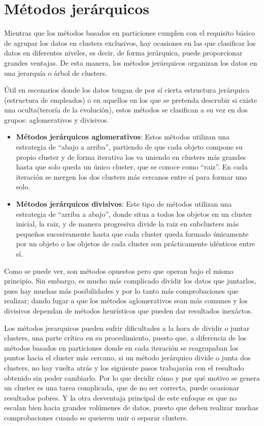 \documentclass[3p,twocolumn]{elsarticle}
\begin{document}
\section{Métodos jerárquicos} \label{sec:Métodos jerárquicos}

Mientras que los métodos basados en particiones cumplen con el requisito básico de agrupar los datos en clusters exclusivos, hay ocasiones en las que clasificar los datos en diferentes niveles, es decir, de forma jerárquica, puede proporcionar grandes ventajas. De esta manera, los métodos jerárquicos organizan los datos en una jerarquía o árbol de clusters. 

Útil en escenarios donde los datos tengan de por sí cierta estructura jerárquica (estructura de empleados) o en aquellos en los que se pretenda descrubir si existe una oculta(teroría de la evolución), estos métodos se clasifican a su vez en dos grupos: aglomerativos y divisivos. 

\begin{itemize}
  \item \textbf{Métodos jerárquicos aglomerativos}: Estos métodos utilizan una estrategia de ``abajo a arriba'', partiendo de que cada objeto compone su propio cluster y de forma iterativa los va uniendo en clusters más grandes hasta que solo queda un único cluster, que se conoce como ``raiz''. En cada iteración se mergen los dos clusters más cercanos entre sí para formar uno solo.

  \item \textbf{Métodos jerárquicos divisivos}: Este tipo de métodos utilizan una estrategia de ``arriba a abajo'', donde situa a todos los objetos en un cluster inicial, la raiz, y de manera progresiva divide la raiz en subclusters más pequeños sucesivamente hasta que cada cluster queda formado únicamente por un objeto o los objetos de cada cluster son prácticamente idénticos entre sí.
\end{itemize}

Como se puede ver, son métodos opuestos pero que operan bajo el mismo principio. Sin embargo, es mucho más complicado dividir los datos que juntarlos, pues hay muchas más posibilidades y por lo tanto más comprobaciones que realizar; dando lugar a que los métodos aglomerativos sean más comunes y los divisivos dependan de métodos heurísticos que pueden dar resultados inexáctos.

Los métodos jerarquicos pueden sufrir dificultades a la hora de dividir o juntar clusters, una parte crítica en su procedimiento, puesto que, a diferencia de los métodos basados en particiones donde en cada iteración se reagrupaban los puntos hacia el cluster más cercano, si un método jerárquico divide o junta dos clusters, no hay vuelta atrás y los siguiente pasos trabajarán con el resultado obtenido sin poder cambiarlo. Por lo que decidir cómo y por qué motivo se genera un cluster es una tarea complicada, que de no ser correcta, puede ocasionar resultados pobres. Y la otra desventaja principal de este enfoque es que no escalan bien hacia grandes volúmenes de datos, puesto que deben realizar muchas comprobaciones cuando se queieren unir o separar clusters.
\end{document}
